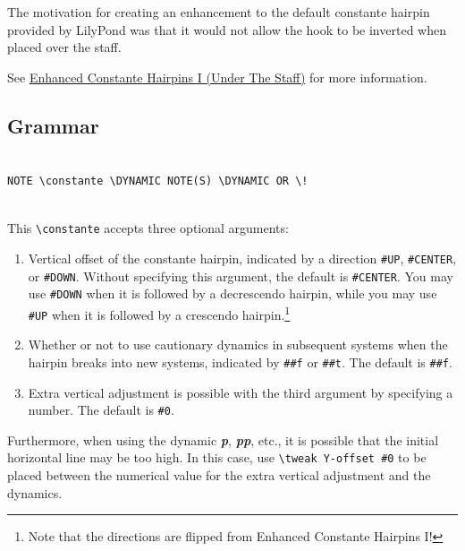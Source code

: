 The motivation for creating an enhancement to the default constante hairpin provided by LilyPond was that it would not allow the hook to be inverted when placed over the staff. 

See \hyperref[sec:enhanced_constante_hairpins_1]{Enhanced Constante Hairpins I (Under The Staff)} for more information.

\subsection{Grammar}
\begin{verbatim}

NOTE \constante \DYNAMIC NOTE(S) \DYNAMIC OR \!
 
\end{verbatim}

This \verb|\constante| accepts three optional arguments:
\begin{enumerate}
\item Vertical offset of the constante hairpin, indicated by a direction \verb|#UP|, \verb|#CENTER|, or \verb|#DOWN|. Without specifying this argument, the default is \verb|#CENTER|. You may use \verb|#DOWN| when it is followed by a decrescendo hairpin, while you may use \verb|#UP| when it is followed by a crescendo hairpin.\footnote{Note that the directions are flipped from Enhanced Constante Hairpins I!} 
\item Whether or not to use cautionary dynamics in subsequent systems when the hairpin breaks into new systems, indicated by \verb|##f| or \verb|##t|. The default is \verb|##f|.
\item Extra vertical adjustment is possible with the third argument by specifying a number. The default is \verb|#0|. 
\end{enumerate}

Furthermore, when using the dynamic \textit{\textbf{p}}, \textbf{\textit{pp}}, etc., it is possible that the initial horizontal line may be too high. In this case, use \verb|\tweak Y-offset #0| to be placed between the numerical value for the extra vertical adjustment and the dynamics. 


